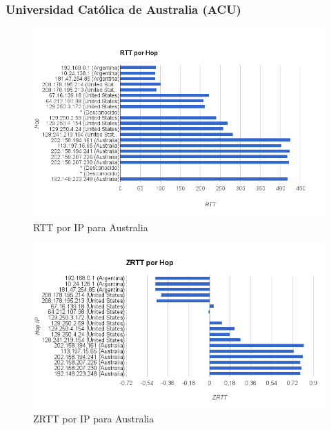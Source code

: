 \subsubsection{Universidad Católica de Australia (ACU)}

\begin{figure}[H]
  \centering
    \includegraphics[width=1\textwidth]{../Experimentacion/Australia/rtt.png}
    \caption{RTT por IP para Australia}
  \label{rtt-aus}
\end{figure}

\begin{figure}[H]
  \centering
    \includegraphics[width=1\textwidth]{../Experimentacion/Australia/zrtt.png}
    \caption{ZRTT por IP para Australia}
  \label{zrtt-aus}
\end{figure}

